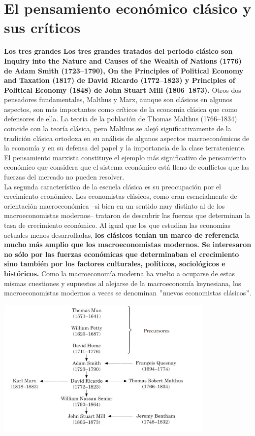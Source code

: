 \documentclass[10pt]{book}
\begin{document}
\part{El pensamiento económico clásico y sus críticos}
\textbf{Los tres grandes Los tres grandes tratados del periodo clásico son Inquiry into the Nature and Causes of the Wealth of Nations (1776) de Adam Smith (1723–1790), On the Principles of Political Economy and Taxation (1817) de David Ricardo (1772–1823) y Principles of Political Economy (1848) de John Stuart Mill (1806–1873).} Otros dos pensadores fundamentales, Malthus y Marx, aunque son clásicos en algunos aspectos, son más importantes como críticos de la economía clásica que como defensores de ella. La teoría de la población de Thomas Malthus (1766–1834) coincide con la teoría clásica, pero Malthus se alejó significativamente de la tradición clásica ortodoxa en su análisis de algunos aspectos macroeconómicos de la economía y en su defensa del papel y la importancia de la clase terrateniente. \\
El pensamiento marxista constituye el ejemplo más significativo de pensamiento económico que considera que el sistema económico está lleno de conflictos que las fuerzas del mercado no pueden resolver.\\
La segunda característica de la escuela clásica es su preocupación por el crecimiento económico. Los economistas clásicos, como eran esencialmente de orientación macroeconómica –si bien en un sentido muy distinto al de los macroeconomistas modernos– trataron de descubrir las fuerzas que determinan la tasa de crecimiento económico. Al igual que los que estudian las economías actuales menos desarrolladas, \textbf{los clásicos tenían un marco de referencia mucho más amplio que los macroeconomistas modernos. Se interesaron no sólo por las fuerzas económicas que determinaban el crecimiento sino también por los factores culturales, políticos, sociológicos e históricos.} Como la macroeconomía moderna ha vuelto a ocuparse de estas mismas cuestiones y supuestos al alejarse de la macroeconomía keynesiana, los macroeconomistas modernos a veces se denominan $"$nuevos economistas clásicos$"$.\\

\begin{center}
    \includegraphics[width=0.8\textwidth]{imagen/influencia.png}
\end{center}
\end{document}
